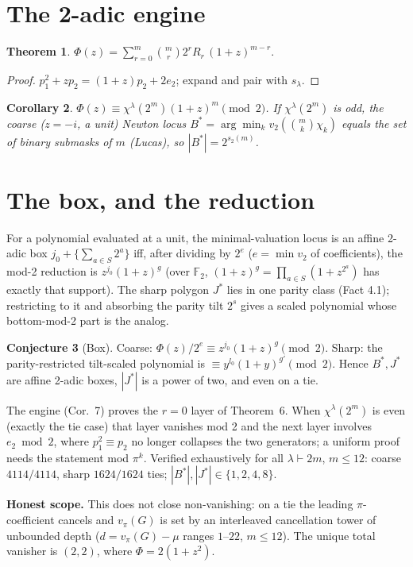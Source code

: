\documentclass[11pt]{article}
\newtheorem{theorem}{Theorem}
\newtheorem{corollary}[theorem]{Corollary}
\theoremstyle{definition}
\newtheorem{conjecture}[theorem]{Conjecture}
\newcommand{\F}{\mathbb{F}}
\begin{document}
\section{The 2-adic engine}
\begin{theorem} $\displaystyle \Phi(z)=\sum_{r=0}^m\binom mr 2^r R_r\,(1+z)^{m-r}.$ \end{theorem}
\begin{proof} $p_1^2+zp_2=(1+z)p_2+2e_2$; expand and pair with $s_\lambda$. \end{proof}
\begin{corollary} $\Phi(z)\equiv\chi^\lambda(2^m)(1+z)^m\pmod2$. If $\chi^\lambda(2^m)$ is odd, the
coarse ($z=-i$, a unit) Newton locus $B^*=\arg\min_kv_2(\binom mk\chi_k)$ equals the set of binary
submasks of $m$ (Lucas), so $|B^*|=2^{s_2(m)}$. \end{corollary}

\section{The box, and the reduction}
For a polynomial evaluated at a unit, the minimal-valuation locus is an affine 2-adic box
$j_0+\{\sum_{a\in S}2^a\}$ iff, after dividing by $2^{e}$ ($e=\min v_2$ of coefficients), the mod-2
reduction is $z^{j_0}(1+z)^{g}$ (over $\F_2$, $(1+z)^g=\prod_{a\in S}(1+z^{2^a})$ has exactly that
support). The sharp polygon $J^*$ lies in one parity class (Fact 4.1); restricting to it and
absorbing the parity tilt $2^s$ gives a scaled polynomial whose bottom-mod-2 part is the analog.
\begin{conjecture}[Box] Coarse: $\Phi(z)/2^{e}\equiv z^{j_0}(1+z)^{g}\pmod2$. Sharp: the
parity-restricted tilt-scaled polynomial is $\equiv y^{l_0}(1+y)^{g'}\pmod2$. Hence $B^*,J^*$ are
affine 2-adic boxes, $|J^*|$ is a power of two, and even on a tie.
\end{conjecture}
The engine (Cor.~7) proves the $r=0$ layer of Theorem~6. When $\chi^\lambda(2^m)$ is even (exactly
the tie case) that layer vanishes mod 2 and the next layer involves $e_2\bmod2$, where
$p_1^2\equiv p_2$ no longer collapses the two generators; a uniform proof needs the statement
mod $\pi^k$. Verified exhaustively for all $\lambda\vdash2m$, $m\le12$: coarse $4114/4114$, sharp
$1624/1624$ ties; $|B^*|,|J^*|\in\{1,2,4,8\}$.

\medskip\noindent\textbf{Honest scope.} This does not close non-vanishing: on a tie the leading
$\pi$-coefficient cancels and $v_\pi(G)$ is set by an interleaved cancellation tower of unbounded
depth ($d=v_\pi(G)-\mu$ ranges $1$--$22$, $m\le12$). The unique total vanisher is $(2,2)$, where
$\Phi=2(1+z^2)$.
\end{document}
